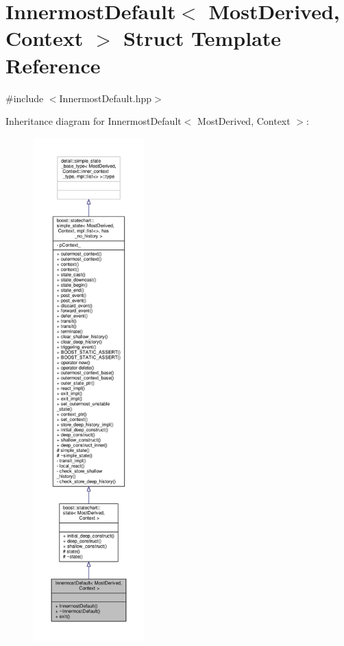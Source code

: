 \hypertarget{struct_innermost_default}{}\section{Innermost\+Default$<$ Most\+Derived, Context $>$ Struct Template Reference}
\label{struct_innermost_default}


{\ttfamily \#include $<$Innermost\+Default.\+hpp$>$}



Inheritance diagram for Innermost\+Default$<$ Most\+Derived, Context $>$\+:
\nopagebreak
\begin{figure}[H]
\begin{center}
\leavevmode
\includegraphics[height=550pt]{struct_innermost_default__inherit__graph}
\end{center}
\end{figure}


